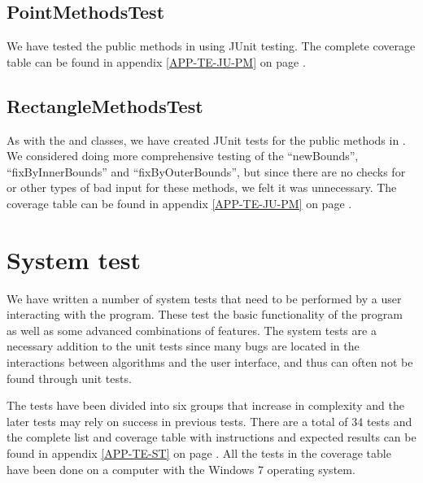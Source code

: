 \subsection{PointMethodsTest}
\label{TEST-JU-PMT}
We have tested the public methods in  using JUnit testing.
The complete coverage table can be found in appendix \ref{APP-TE-JU-PM} on page
\pageref{APP-TE-JU-PM}.

\subsection{RectangleMethodsTest}
\label{TEST-JU-RMT}
As with the  and  classes, we have created
JUnit tests for the public methods in . We considered
doing more comprehensive testing of the ``newBounds'', ``fixByInnerBounds'' and
``fixByOuterBounds'', but since there are no checks for  or other
types of bad input for these methods, we felt it was unnecessary. The coverage
table can be found in appendix \ref{APP-TE-JU-PM} on page
\pageref{APP-TE-JU-PM}.

\section{System test}
\label{TEST-ST}
We have written a number of system tests that need to be performed by a
user interacting with the program. These test the basic functionality of the
program as well as some advanced combinations of features. The system tests are
a necessary addition to the unit tests since many bugs are located in the
interactions between algorithms and the user interface, and thus can often not
be found through unit tests. 

The tests have been divided into six groups that increase in
complexity and the later tests may rely on success in previous tests. There are
a total of 34 tests and the complete list and coverage table with instructions
and expected results can be found in appendix \ref{APP-TE-ST} on page
\pageref{APP-TE-ST}. All the tests in the coverage table have been done on a
computer with the Windows 7 operating system.